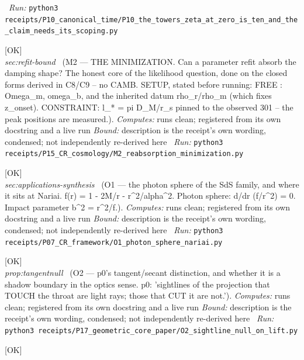 \begin{description}
\ \emph{Run:} \texttt{python3 receipts/P10\_canonical\_time/P10\_the\_towers\_zeta\_at\_zero\_is\_ten\_and\_the\_claim\_needs\_its\_scoping.py}
\item[\label{rcpt:M2_reabsorption_minimization}\texttt{M2\_reabsorption\_minimization}]\hfill\textsf{[OK]}\\
\textit{sec:refit-bound} \ (M2 --- THE MINIMIZATION. Can a parameter refit absorb the damping shape? The honest core of the likelihood question, done on the closed forms derived in C8/C9 -- no CAMB. SETUP, stated before running: FREE : Omega\_m, omega\_b, and the inherited datum rho\_r/rho\_m (which fixes z\_onset). CONSTRAINT: l\_* = pi D\_M/r\_s pinned to the observed 301 -- the peak positions are measured.). 
\emph{Computes:} runs clean; registered from its own docstring and a live run
 \emph{Bound:} description is the receipt's own wording, condensed; not independently re-derived here
\ \emph{Run:} \texttt{python3 receipts/P15\_CR\_cosmology/M2\_reabsorption\_minimization.py}
\item[\label{rcpt:O1_photon_sphere_nariai}\texttt{O1\_photon\_sphere\_nariai}]\hfill\textsf{[OK]}\\
\textit{sec:applications-synthesis} \ (O1 --- the photon sphere of the SdS family, and where it sits at Nariai. f(r) = 1 - 2M/r - r\textasciicircum{}2/alpha\textasciicircum{}2. Photon sphere: d/dr (f/r\textasciicircum{}2) = 0. Impact parameter b\textasciicircum{}2 = r\textasciicircum{}2/f.). 
\emph{Computes:} runs clean; registered from its own docstring and a live run
 \emph{Bound:} description is the receipt's own wording, condensed; not independently re-derived here
\ \emph{Run:} \texttt{python3 receipts/P07\_CR\_framework/O1\_photon\_sphere\_nariai.py}
\item[\label{rcpt:O2_sightline_null_on_lift}\texttt{O2\_sightline\_null\_on\_lift}]\hfill\textsf{[OK]}\\
\textit{prop:tangentnull} \ (O2 --- p0's tangent/secant distinction, and whether it is a shadow boundary in the optics sense. p0: 'sightlines of the projection that TOUCH the throat are light rays; those that CUT it are not.'). 
\emph{Computes:} runs clean; registered from its own docstring and a live run
 \emph{Bound:} description is the receipt's own wording, condensed; not independently re-derived here
\ \emph{Run:} \texttt{python3 receipts/P17\_geometric\_core\_paper/O2\_sightline\_null\_on\_lift.py}
\item[\label{rcpt:O3_charting_distance}\texttt{O3\_charting\_distance}]\hfill\textsf{[OK]}\\

\end{description}
